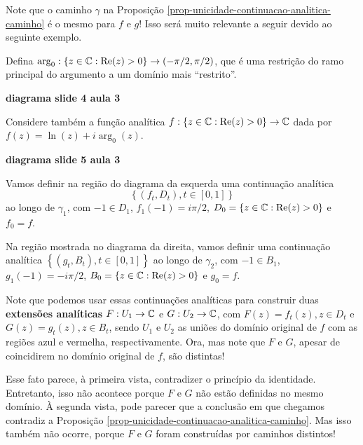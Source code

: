     \begin{observacao}
        Note que o caminho $\gamma$ na 
        Proposição \ref{prop-unicidade-continuacao-analitica-caminho} é o
        mesmo para $f$ e $g$! Isso será muito relevante a seguir devido ao 
        seguinte exemplo.
        
        Defina $\arg_0: \left\{ z\in\mathbb{C} : \mathrm{Re}(z) > 0 \right\} \to (-\pi/2, \pi/2)$,
        que é uma restrição do ramo principal do argumento a um domínio mais ``restrito''.
        \begin{center}
            \textbf{diagrama slide 4 aula 3}
        \end{center}
        Considere também a função analítica 
        $f: \left\{ z\in\mathbb{C} : \mathrm{Re}(z) > 0 \right\} \to\mathbb{C}$
        dada por $f(z) = \ln(z) + i\arg_0(z)$.
        \begin{center}
            \textbf{diagrama slide 5 aula 3}
        \end{center}
        Vamos definir na região do diagrama da esquerda uma continuação analítica
        \begin{equation*}
            \left\{ (f_t, D_t), t\in [0,1] \right\}
        \end{equation*}
        ao longo de $\gamma_1$, com $-1\in D_1$, $f_1(-1) = i\pi/2$,
        $D_0 = \left\{ z\in\mathbb{C} : \mathrm{Re}(z) > 0 \right\}$ e $f_0 = f$.
        
        Na região mostrada no diagrama da direita, vamos definir uma continuação analítica
        $\left\{ (g_t, B_t), t\in [0,1] \right\}$ ao longo de $\gamma_2$,
        com $-1\in B_1$, $g_1(-1) = -i\pi/2$, 
        $B_0 = \left\{ z\in\mathbb{C} : \mathrm{Re}(z) > 0 \right\}$ e $g_0 = f$.
        
        Note que podemos usar essas continuações analíticas para construir duas
        \textbf{extensões analíticas} $F:U_1\to\mathbb{C}$ e $G:U_2\to\mathbb{C}$, 
        com $F(z) = f_t(z), z\in D_t$ e $G(z) = g_t(z), z\in B_t$, 
        sendo $U_1$ e $U_2$ as uniões do domínio original de $f$
        com as regiões azul e vermelha, respectivamente. Ora, mas note que
        $F$ e $G$, apesar de coincidirem no domínio original de $f$, são distintas!
        
        Esse fato parece, à primeira vista, contradizer o princípio da identidade. 
        Entretanto, isso não acontece porque $F$ e $G$ não estão definidas no mesmo
        domínio. À segunda vista, pode parecer que a conclusão em que chegamos contradiz
        a Proposição \ref{prop-unicidade-continuacao-analitica-caminho}. Mas isso também 
        não ocorre, porque $F$ e $G$ foram construídas por caminhos distintos!
    \end{observacao}


